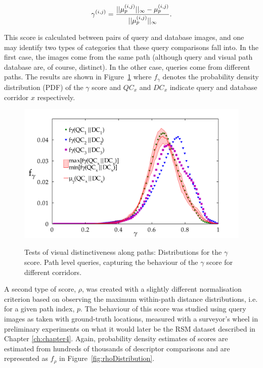 \begin{equation}
\centering
\gamma^{(i,j)} = \frac{||\mu^{(i,j)}_p||_{\infty}-\mu^{(i,j)}_p}{||\mu^{(i,j)}_p||_{\infty}}.
\end{equation}

This score is calculated between pairs of query and database images, and one may identify two types of categories that these query comparisons fall into.  In the first case, the images come from the same path (although query and visual path database are, of course, distinct).  In the other case, queries come from different paths.  The results are shown in Figure~\ref{fig:gammaDistribution} where $f_\gamma$ denotes the probability density distribution (PDF) of the $\gamma$ score and $QC_x$ and $DC_x$ indicate query and database corridor $x$ respectively.   

\begin{figure}[ht]
\centering
{\includegraphics[width=\linewidth]{./gfx/Chapter02/path_pdf_analysisWithShadedBetweensALLDB.pdf}}
\caption{Tests of visual distinctiveness along paths: Distributions for the $\gamma$ score. Path level queries, capturing the behaviour of the $\gamma$ score for different corridors.}
\label{fig:gammaDistribution}
\end{figure}
 



A second type of score, $\rho$, was created with a slightly different normalisation criterion based on observing the maximum within-path distance distributions, i.e. for a given path index, $p$.  The behaviour of this score was studied using query images as taken with ground-truth locations, measured with a surveyor's wheel in preliminary experiments on what it would later be the RSM dataset described in Chapter \ref{ch:chapter4}. Again, probability density estimates of scores are estimated from hundreds of thousands of descriptor comparisons and are represented as $f_\rho$ in Figure~\ref{fig:rhoDistribution}.


